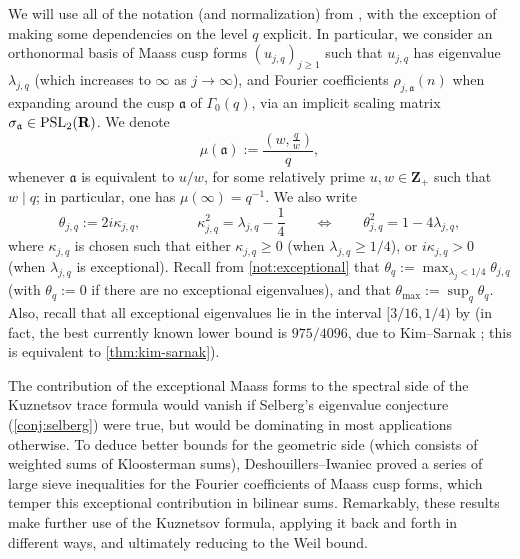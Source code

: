 \documentclass[reqno,11pt]{amsart}
\theoremstyle{definition}
\theoremstyle{remark}
\numberwithin{equation}{section}
\newcommand{\Z}{\mathbf{Z}}
\newcommand{\R}{\mathbf{R}}
\newcommand{\ma}{\mathfrak{a}}
\newcommand{\PSL}{\textnormal{PSL}}
\begin{document}
We will use all of the notation (and normalization) from \cite{deshouillers1982kloosterman}, with the exception of making some dependencies on the level $q$ explicit. In particular, we consider an orthonormal basis of Maass cusp forms $(u_{j,q})_{j \ge 1}$ such that $u_{j,q}$ has eigenvalue $\lambda_{j,q}$ (which increases to $\infty$ as $j \to \infty$), and Fourier coefficients $\rho_{j,\ma}(n)$ when expanding around the cusp $\ma$ of $\Gamma_0(q)$, via an implicit scaling matrix $\sigma_\ma \in \PSL_2(\R)$. We denote 
\[
    \mu(\ma) := \frac{\left(w, \frac{q}{w}\right)}{q},
\]
whenever $\ma$ is equivalent to $u/w$, for some relatively prime $u, w \in \Z_+$ such that $w \mid q$; in particular, one has $\mu(\infty) = q^{-1}$. We also write
\[
    \theta_{j,q} := 2i \kappa_{j,q},
    \qquad\qquad
    \kappa_{j,q}^2 = \lambda_{j,q} - \frac{1}{4}
    \qquad \iff \qquad
    \theta_{j,q}^2 = 1 - 4\lambda_{j,q},
\]
where $\kappa_{j,q}$ is chosen such that either $\kappa_{j,q} \ge 0$ (when $\lambda_{j,q} \ge 1/4$), or $i\kappa_{j,q} > 0$ (when $\lambda_{j,q}$ is exceptional). Recall from \cref{not:exceptional} that $\theta_q := \max_{\lambda_j < 1/4} \theta_{j,q}$ (with $\theta_q := 0$ if there are no exceptional eigenvalues), and that $\theta_{\max} := \sup_q \theta_q$. Also, recall that all exceptional eigenvalues lie in the interval $[3/16, 1/4)$ by \cite[Theorem 4]{deshouillers1982kloosterman} (in fact, the best currently known lower bound is $975/4096$, due to Kim--Sarnak \cite[Appendix 2]{kim2003functoriality}; this is equivalent to \cref{thm:kim-sarnak}).

The contribution of the exceptional Maass forms to the spectral side of the Kuznetsov trace formula would vanish if Selberg's eigenvalue conjecture (\cref{conj:selberg}) were true, but would be dominating in most applications otherwise. To deduce better bounds for the geometric side (which consists of weighted sums of Kloosterman sums), Deshouillers--Iwaniec \cite{deshouillers1982kloosterman} proved a series of large sieve inequalities for the Fourier coefficients of Maass cusp forms, which temper this exceptional contribution in bilinear sums. Remarkably, these results make further use of the Kuznetsov formula, applying it back and forth in different ways, and ultimately reducing to the Weil bound.
\end{document}
